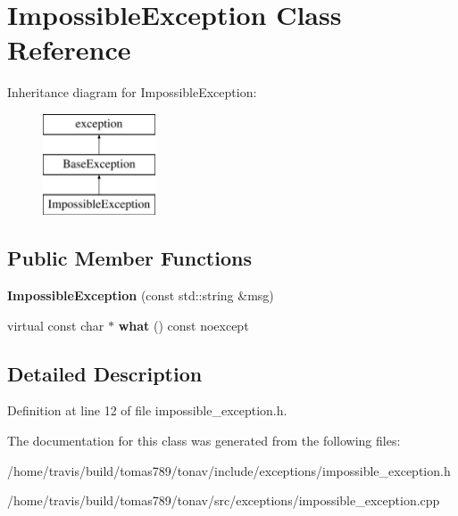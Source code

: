 \hypertarget{class_impossible_exception}{\section{Impossible\-Exception Class Reference}
\label{class_impossible_exception}
}
Inheritance diagram for Impossible\-Exception\-:\begin{figure}[H]
\begin{center}
\leavevmode
\includegraphics[height=3.000000cm]{class_impossible_exception}
\end{center}
\end{figure}
\subsection*{Public Member Functions}
\begin{DoxyCompactItemize}
\item 
\hypertarget{class_impossible_exception_a88afecc506123920b1bcd8f8b1bc612d}{{\bfseries Impossible\-Exception} (const std\-::string \&msg)}\label{class_impossible_exception_a88afecc506123920b1bcd8f8b1bc612d}

\item 
\hypertarget{class_impossible_exception_a3368d553e27e69451266f56bc37e9a86}{virtual const char $\ast$ {\bfseries what} () const noexcept}\label{class_impossible_exception_a3368d553e27e69451266f56bc37e9a86}

\end{DoxyCompactItemize}


\subsection{Detailed Description}


Definition at line 12 of file impossible\-\_\-exception.\-h.



The documentation for this class was generated from the following files\-:\begin{DoxyCompactItemize}
\item 
/home/travis/build/tomas789/tonav/include/exceptions/impossible\-\_\-exception.\-h\item 
/home/travis/build/tomas789/tonav/src/exceptions/impossible\-\_\-exception.\-cpp\end{DoxyCompactItemize}

